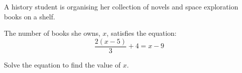 \begin{question}
\noindent A history student is organising her collection of novels and space exploration books on a shelf.

The number of books she owns, $x$, satisfies the equation:
\[
\frac{2(x - 5)}{3} + 4 = x - 9
\]

Solve the equation to find the value of $x$.
\vspace{5cm}
\end{question}
